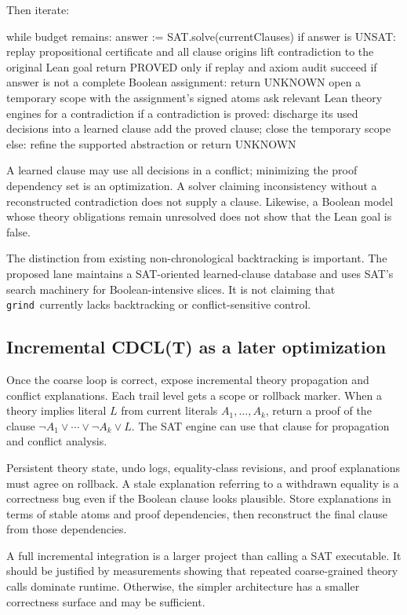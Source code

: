 \documentclass[11pt,a4paper]{article}
\newcommand{\grind}{\texttt{grind}}
\begin{document}
Then iterate:
\begin{code}
while budget remains:
  answer := SAT.solve(currentClauses)
  if answer is UNSAT:
    replay propositional certificate and all clause origins
    lift contradiction to the original Lean goal
    return PROVED only if replay and axiom audit succeed
  if answer is not a complete Boolean assignment:
    return UNKNOWN
  open a temporary scope with the assignment's signed atoms
  ask relevant Lean theory engines for a contradiction
  if a contradiction is proved:
    discharge its used decisions into a learned clause
    add the proved clause; close the temporary scope
  else:
    refine the supported abstraction or return UNKNOWN
\end{code}

A learned clause may use all decisions in a conflict; minimizing the proof dependency set is an optimization. A solver claiming inconsistency without a reconstructed contradiction does not supply a clause. Likewise, a Boolean model whose theory obligations remain unresolved does not show that the Lean goal is false.

The distinction from existing non-chronological backtracking is important. The proposed lane maintains a SAT-oriented learned-clause database and uses SAT's search machinery for Boolean-intensive slices. It is not claiming that \grind\ currently lacks backtracking or conflict-sensitive control.\cite{grind-action}

\subsection{Incremental CDCL(T) as a later optimization}

Once the coarse loop is correct, expose incremental theory propagation and conflict explanations. Each trail level gets a scope or rollback marker. When a theory implies literal $L$ from current literals $A_1,\ldots,A_k$, return a proof of the clause $\neg A_1\lor\cdots\lor\neg A_k\lor L$. The SAT engine can use that clause for propagation and conflict analysis.

Persistent theory state, undo logs, equality-class revisions, and proof explanations must agree on rollback. A stale explanation referring to a withdrawn equality is a correctness bug even if the Boolean clause looks plausible. Store explanations in terms of stable atoms and proof dependencies, then reconstruct the final clause from those dependencies.

A full incremental integration is a larger project than calling a SAT executable. It should be justified by measurements showing that repeated coarse-grained theory calls dominate runtime. Otherwise, the simpler architecture has a smaller correctness surface and may be sufficient.
\end{document}
